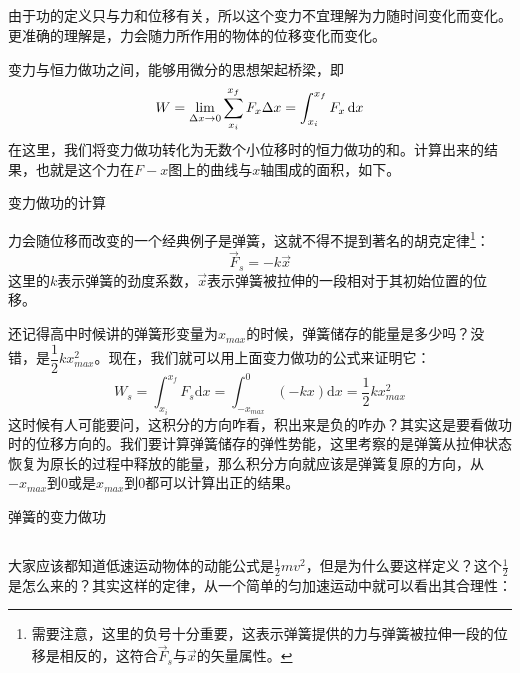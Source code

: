 \subsection[变力做功]{}
由于功的定义只与力和位移有关，所以这个变力不宜理解为力随时间变化而变化。更准确的理解是，力会随力所作用的物体的位移变化而变化。

变力与恒力做功之间，能够用微分的思想架起桥梁，即
\[W=\lim_{\Delta x \to 0} \sum_{x_{i}}^{x_{f}}F_{x}\Delta x=\int_{x_{i}}^{x_{f}}F_{x}\dif x\]
在这里，我们将变力做功转化为无数个小位移时的恒力做功的和。计算出来的结果，也就是这个力在$F-x$图上的曲线与$x$轴围成的面积，如下。
\begin{center}
    变力做功的计算
\end{center}
力会随位移而改变的一个经典例子是弹簧，这就不得不提到著名的胡克定律\footnote{需要注意，这里的负号十分重要，这表示弹簧提供的力与弹簧被拉伸一段的位移是相反的，这符合$\vec{F}_{s}$与$\vec{x}$的矢量属性。}：
\[\vec{F}_{s}=-k\vec{x}\]
这里的$k$表示弹簧的劲度系数，$\vec{x}$表示弹簧被拉伸的一段相对于其初始位置的位移。

还记得高中时候讲的弹簧形变量为$x_{max}$的时候，弹簧储存的能量是多少吗？没错，是$\dfrac{1}{2} kx_{max}^{2}$。现在，我们就可以用上面变力做功的公式来证明它：
\[W_{s}=\int_{x_{i}}^{x_{f}}F_{s}\mathrm{d}x=\int_{-x_{max}}^{0}(-kx)\mathrm{d}x=\frac{1}{2} kx_{max}^{2}\]
这时候有人可能要问，这积分的方向咋看，积出来是负的咋办？其实这是要看做功时的位移方向的。我们要计算弹簧储存的弹性势能，这里考察的是弹簧从拉伸状态恢复为原长的过程中释放的能量，那么积分方向就应该是弹簧复原的方向，从$-x_{max}$到$0$或是$x_{max}$到$0$都可以计算出正的结果。

\begin{center}
    弹簧的变力做功
\end{center}
\subsection[动能]{}
大家应该都知道低速运动物体的动能公式是$\frac{1}{2}mv^{2} $，但是为什么要这样定义？这个$\frac{1}{2}$是怎么来的？其实这样的定律，从一个简单的匀加速运动中就可以看出其合理性：

